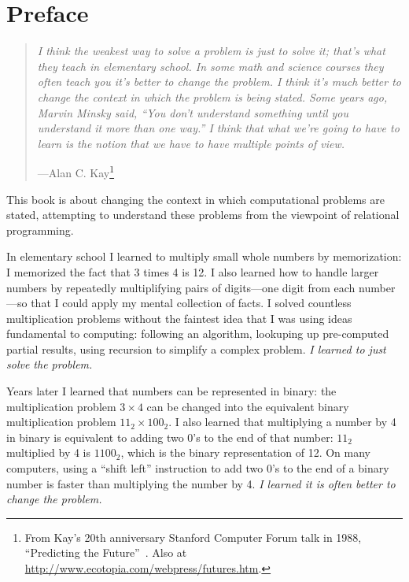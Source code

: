 \chapter{Preface}\label{sec:preface}

\vspace{-1cm}

\begin{quotation}
\noindent
\emph{I think the weakest way to solve a problem is just to solve it; that's what they teach in elementary school. In some math and science courses they often teach you it's better to change the problem. I think it's much better to change the context in which the problem is being stated. Some years ago, Marvin Minsky said, ``You don't understand something until you understand it more than one way.'' I think that what we're going to have to learn is the notion that we have to have multiple points of view.}
\begin{flushright}
\vspace{-0.3em}
---Alan C. Kay\footnote{From Kay's 20th anniversary Stanford Computer Forum talk in 1988, ``Predicting the Future''~\cite{Kay:1989}. Also at \url{http://www.ecotopia.com/webpress/futures.htm}.}
\end{flushright}
\end{quotation}


This book is about changing the context in which computational
problems are stated, attempting to understand these problems from the
viewpoint of relational programming.


In elementary school I learned to multiply small whole numbers by
memorization: I memorized the fact that 3 times 4 is 12.
%
I also learned how to handle larger numbers by repeatedly
multiplifying pairs of digits---one digit from each number---so that I
could apply my mental collection of facts.
%
I solved countless multiplication problems without the faintest idea
that I was using ideas fundamental to computing: following an
algorithm, lookuping up pre-computed partial results, using recursion
to simplify a complex problem.
%
\emph{I learned to just solve the problem.}


Years later I learned that numbers can be represented in binary: the
multiplication problem \mbox{$3 \times 4$} can be changed into the
equivalent binary multiplication problem \mbox{$11_2 \times 100_2$}.
%
I also learned that multiplying a number by 4 in binary is equivalent
to adding two 0's to the end of that number: $11_2$ multiplied by 4 is
$1100_2$, which is the binary representation of 12.
%
On many computers, using a ``shift left'' instruction to add two 0's to
the end of a binary number is faster than multiplying the number by 4.
%
\emph{I learned it is often better to change the problem.}






